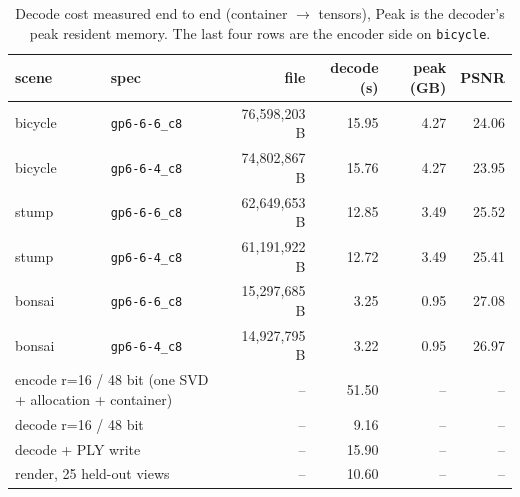 \begin{table}[t]
\centering
\small
\footnotesize
\setlength{\tabcolsep}{2.8pt}
\caption{Decode cost measured end to end (container $\rightarrow$ tensors), Peak is the decoder's peak resident memory. The last four rows are the encoder side on \texttt{bicycle}.}
\label{tab:cost}
\begin{tabular}{llrrrr}
\toprule
scene & spec & file & decode (s) & peak (GB) & PSNR \\
\midrule
bicycle & \texttt{gp6-6-6\_c8} & 76,598,203 B & 15.95 & 4.27 & 24.06 \\
bicycle & \texttt{gp6-6-4\_c8} & 74,802,867 B & 15.76 & 4.27 & 23.95 \\
stump & \texttt{gp6-6-6\_c8} & 62,649,653 B & 12.85 & 3.49 & 25.52 \\
stump & \texttt{gp6-6-4\_c8} & 61,191,922 B & 12.72 & 3.49 & 25.41 \\
bonsai & \texttt{gp6-6-6\_c8} & 15,297,685 B & 3.25 & 0.95 & 27.08 \\
bonsai & \texttt{gp6-6-4\_c8} & 14,927,795 B & 3.22 & 0.95 & 26.97 \\
\midrule
\multicolumn{2}{l}{encode r=16 / 48 bit (one SVD + allocation + container)} & -- & 51.50 & -- & -- \\
\multicolumn{2}{l}{decode r=16 / 48 bit} & -- & 9.16 & -- & -- \\
\multicolumn{2}{l}{decode + PLY write} & -- & 15.90 & -- & -- \\
\multicolumn{2}{l}{render, 25 held-out views} & -- & 10.60 & -- & -- \\
\bottomrule
\end{tabular}
\end{table}
